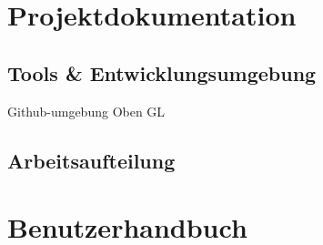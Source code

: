 \documentclass[11pt]{article}
\begin{document}

\section{Projektdokumentation}

\subsection{Tools \& Entwicklungsumgebung}
Github-umgebung
Oben GL

\subsection{Arbeitsaufteilung}

\section{Benutzerhandbuch}

\pagebreak

\end{document}
